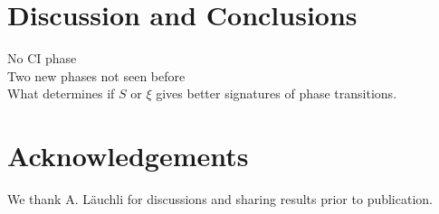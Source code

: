 \documentclass[aps,prx,10pt,twocolumn,floatfix,superscriptaddress,showpacs,numerical,footinbib]{revtex4-1}
\begin{document}
% 




%
\section{Discussion and Conclusions}
%



No CI phase\\
%
Two new phases not seen before\\
%
What determines if $S$ or $\xi$ gives better signatures of phase transitions. 

\section{Acknowledgements}

We thank A. Läuchli for discussions and sharing results prior to publication.


\end{document}
